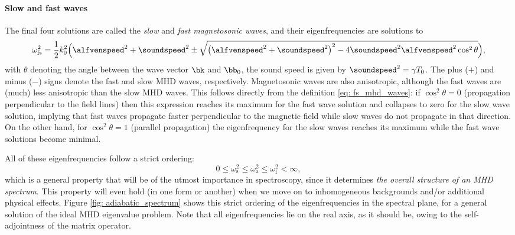 \paragraph{Slow and fast waves}
The final four solutions are called the \emph{slow} and \emph{fast magnetosonic waves}, and their eigenfrequencies are solutions to
\begin{equation} \label{eq: fs_mhd_waves}
  \omega_\text{fs}^2 = \frac{1}{2}k_0^2\Bigl(
    \alfvenspeed^2 + \soundspeed^2 \pm \sqrt{
      \left(\alfvenspeed^2 + \soundspeed^2\right)^2 - 4 \soundspeed^2 \alfvenspeed^2 \cos^2\theta
    }
  \Bigr),
\end{equation}
with $\theta$ denoting the angle between the wave vector $\bk$ and $\bb_0$, the sound speed is given by $\soundspeed^2 = \gamma T_0$. The plus ($+$) and minus ($-$) signs denote the fast and slow MHD waves, respectively. Magnetosonic waves are also anisotropic, although the fast waves are (much) less anisotropic than the slow MHD waves. This follows directly from the definition \eqref{eq: fs_mhd_waves}: if $\cos^2\theta = 0$ (propagation perpendicular to the field lines) then this expression reaches its maximum for the fast wave solution and collapses to zero for the slow wave solution, implying that fast waves propagate faster perpendicular to the magnetic field while slow waves do not propagate in that direction. On the other hand, for $\cos^2\theta = 1$ (parallel propagation) the eigenfrequency for the slow waves reaches its maximum while the fast wave solutions become minimal.

All of these eigenfrequencies follow a strict ordering:
\begin{equation} \label{eq: omega_ordening}
  0 \leq \omega_\text{s}^2 \leq \omega_\text{a}^2 \leq \omega_\text{f}^2 < \infty,
\end{equation}
which is a general property that will be of the utmost importance in spectroscopy, since it determines \emph{the overall structure of an MHD spectrum}. This property will even hold (in one form or another) when we move on to inhomogeneous backgrounds and/or additional physical effects. Figure \ref{fig: adiabatic_spectrum} shows this strict ordering of the eigenfrequencies in the spectral plane, for a general solution of the ideal MHD eigenvalue problem. Note that all eigenfrequencies lie on the real axis, as it should be, owing to the self-adjointness of the matrix operator.


